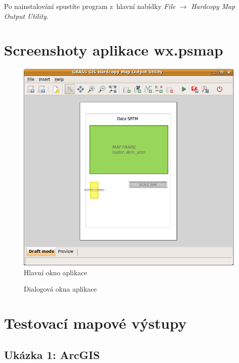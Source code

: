 \documentclass[a4paper,12pt,draft]{article}
\newif\ifbc %
\begin{document}
Po nainstalování spustíte program z~hlavní nabídky \emph{File $\rightarrow$ Hardcopy Map Output Utility}.
\fi

\newpage
\section{Screenshoty aplikace wx.psmap}
\label{priloha:screenshot:psmap}
\begin{figure}[h!]
  \centering
  \includegraphics[height=0.4\textheight]{./GUI_screenshots/psmap_main.png}
  \caption{Hlavní okno aplikace}
  \label{fig:main}
\end{figure}
\begin{figure}[h!]
\centering
{}
\quad
{}
\caption{Dialogová okna aplikace\label{fig:dialogy}}
\end{figure}

\newpage
\ifbc
\section{Testovací mapové výstupy}
\label{priloha:vystupy}
\subsection{Ukázka 1: ArcGIS}
\label{priloha:vystupy:arcgis1}
\end{document}

